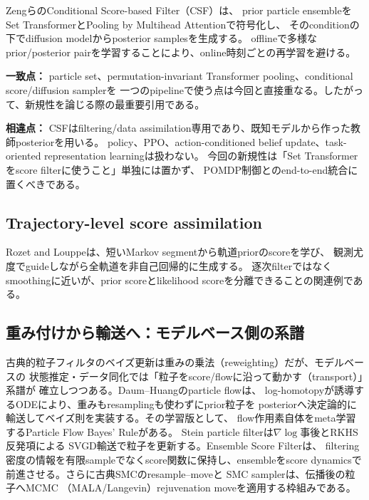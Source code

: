\documentclass[a4paper,11pt]{article}
\newcommand{\matchpoint}{\par\noindent\textbf{一致点：}}
\newcommand{\difference}{\par\noindent\textbf{相違点：}}
\begin{document}
ZengらのConditional Score-based Filter（CSF）\cite{zeng2025csf}は、
prior particle ensembleをSet TransformerとPooling by Multihead Attentionで符号化し、
そのconditionの下でdiffusion modelからposterior samplesを生成する。
offlineで多様なprior/posterior pairを学習することにより、online時刻ごとの再学習を避ける。

\matchpoint
particle set、permutation-invariant Transformer pooling、conditional score/diffusion samplerを
一つのpipelineで使う点は今回と直接重なる。したがって、新規性を論じる際の最重要引用である。

\difference
CSFはfiltering/data assimilation専用であり、既知モデルから作った教師posteriorを用いる。
policy、PPO、action-conditioned belief update、task-oriented representation learningは扱わない。
今回の新規性は「Set Transformerをscore filterに使うこと」単独には置かず、
POMDP制御とのend-to-end統合に置くべきである。

\subsection{Trajectory-level score assimilation}

Rozet and Louppe\cite{rozet2023sda}は、短いMarkov segmentから軌道priorのscoreを学び、
観測尤度でguideしながら全軌道を非自己回帰的に生成する。
逐次filterではなくsmoothingに近いが、prior scoreとlikelihood scoreを分離できることの関連例である。

\subsection{重み付けから輸送へ：モデルベース側の系譜}

古典的粒子フィルタのベイズ更新は重みの乗法（reweighting）だが、モデルベースの
状態推定・データ同化では「粒子をscore/flowに沿って動かす（transport）」系譜が
確立しつつある。Daum--Huangのparticle flow\cite{daum2010particleflow}は、
log-homotopyが誘導するODEにより、重みもresamplingも使わずにprior粒子を
posteriorへ決定論的に輸送してベイズ則を実装する。その学習版として、
flow作用素自体をmeta学習するParticle Flow Bayes' Rule\cite{chen2019metaflow}がある。
Stein particle filter\cite{maken2022stein}は$\nabla\log$事後とRKHS反発項による
SVGD輸送で粒子を更新する。Ensemble Score Filter\cite{bao2024ensf}は、
filtering密度の情報を有限sampleでなくscore関数に保持し、ensembleをscore dynamicsで
前進させる。さらに古典SMCのresample--move\cite{gilks2001resamplemove}と
SMC sampler\cite{delmoral2006smcsamplers}は、伝播後の粒子へMCMC
（MALA/Langevin）rejuvenation moveを適用する枠組みである。
\end{document}

